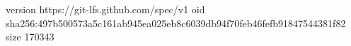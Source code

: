 version https://git-lfs.github.com/spec/v1
oid sha256:497b500573a5c161ab945ea025eb8c6039db94f70feb46fefb91847544381f82
size 170343
